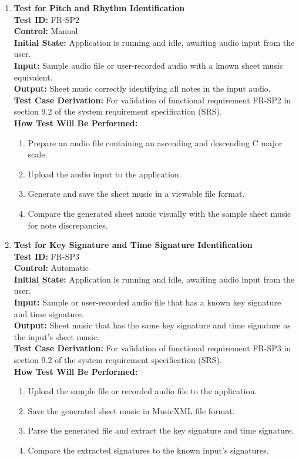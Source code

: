 \documentclass[12pt, titlepage]{article}
\begin{document}
\begin{enumerate}
    \item \textbf{Test for Pitch and Rhythm Identification} \\
      \newline
      \textbf{Test ID:} FR-SP2 \\
      \textbf{Control:} Manual \\
      \textbf{Initial State:} Application is running and idle, awaiting audio input from the user. \\
      \textbf{Input:} Sample audio file or user-recorded audio with a known sheet music equivalent. \\
      \textbf{Output:} Sheet music correctly identifying all notes in the input audio. \\
      \textbf{Test Case Derivation:} For validation of functional requirement FR-SP2 in section 9.2 of the system requirement specification (SRS). \\
      \textbf{How Test Will Be Performed:}
      \begin{enumerate}
          \item Prepare an audio file containing an ascending and descending C major scale.
          \item Upload the audio input to the application.
          \item Generate and save the sheet music in a viewable file format.
          \item Compare the generated sheet music visually with the sample sheet music for note discrepancies.
      \end{enumerate}

    \item \textbf{Test for Key Signature and Time Signature Identification} \\
      \newline
      \textbf{Test ID:} FR-SP3 \\
      \textbf{Control:} Automatic \\
      \textbf{Initial State:} Application is running and idle, awaiting audio input from the user. \\
      \textbf{Input:} Sample or user-recorded audio file that has a known key signature and time signature. \\
      \textbf{Output:} Sheet music that has the same key signature and time signature as the input’s sheet music. \\
      \textbf{Test Case Derivation:} For validation of functional requirement FR-SP3 in section 9.2 of the system requirement specification (SRS). \\
      \textbf{How Test Will Be Performed:}
      \begin{enumerate}
          \item Upload the sample file or recorded audio file to the application.
          \item Save the generated sheet music in MusicXML file format.
          \item Parse the generated file and extract the key signature and time signature.
          \item Compare the extracted signatures to the known input’s signatures.
      \end{enumerate}


\end{enumerate}
\end{document}
